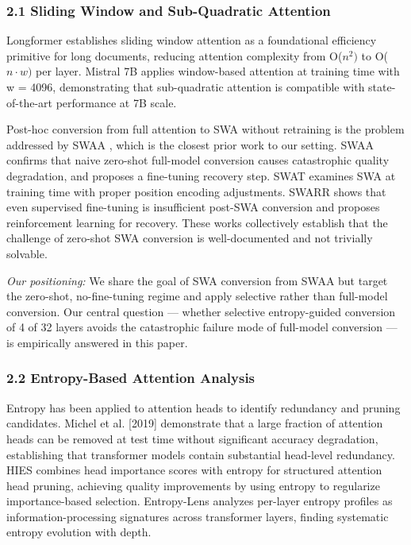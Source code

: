 
\subsubsection{2.1 Sliding Window and Sub-Quadratic Attention}

Longformer \citep{Beltagy2020Longformer} establishes sliding window attention as a foundational efficiency primitive for long documents, reducing attention complexity from O($n^{2})$ to O($n\cdot w)$ per layer. Mistral 7B \citep{Jiang2023Mistral} applies window-based attention at training time with w = 4096, demonstrating that sub-quadratic attention is compatible with state-of-the-art performance at 7B scale.

Post-hoc conversion from full attention to SWA without retraining is the problem addressed by SWAA \citep{Yu2025SWAA}, which is the closest prior work to our setting. SWAA confirms that naive zero-shot full-model conversion causes catastrophic quality degradation, and proposes a fine-tuning recovery step. SWAT \citep{Fu2025Sliding} examines SWA at training time with proper position encoding adjustments. SWARR \citep{Liu2026Architecture} shows that even supervised fine-tuning is insufficient post-SWA conversion and proposes reinforcement learning for recovery. These works collectively establish that the challenge of zero-shot SWA conversion is well-documented and not trivially solvable.

\textit{Our positioning:} We share the goal of SWA conversion from SWAA but target the zero-shot, no-fine-tuning regime and apply selective rather than full-model conversion. Our central question --- whether selective entropy-guided conversion of 4 of 32 layers avoids the catastrophic failure mode of full-model conversion --- is empirically answered in this paper.

\subsubsection{2.2 Entropy-Based Attention Analysis}

Entropy has been applied to attention heads to identify redundancy and pruning candidates. Michel et al. [2019] demonstrate that a large fraction of attention heads can be removed at test time without significant accuracy degradation, establishing that transformer models contain substantial head-level redundancy. HIES \citep{Choi2025Entropy} combines head importance scores with entropy for structured attention head pruning, achieving quality improvements by using entropy to regularize importance-based selection. Entropy-Lens \citep{Ali2025Entropy} analyzes per-layer entropy profiles as information-processing signatures across transformer layers, finding systematic entropy evolution with depth.

